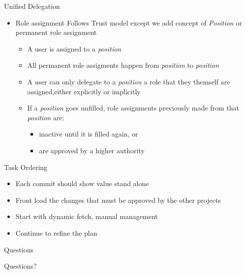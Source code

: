 \documentclass{beamer}
\begin{document}
\begin{frame}{Unified Delegation}
  \begin{itemize}
  \item Role assignment Follows Trust model except we add concept of \textit{Position} or permanent role assignment
    \begin{itemize}
    \item A user is assigned to a \textit{position}
    \item All permanent role assigments happen from \textit{position} to \textit{position}
    \item A user can only delegate to a \textit{position} a role that they themself are assigned,either explicitly or implicitly
    \item If a \textit{position} goes unfilled, role assignments previously made from that \textit{position} are:
      \begin{itemize}
      \item inactive until it is filled again, or
      \item are approved by a higher authority
      \end{itemize}
    \end{itemize}
  \end{itemize}
\end{frame}

    

\begin{frame}{Task Ordering}
  \begin{itemize}
  \item Each commit should show value stand alone
  \item Front load the changes that must be approved by the other projects
  \item Start with dynamic fetch, manual management
  \item Continue to refine the plan
  \end{itemize}
\end{frame}



\begin{frame}{Questions}
  \begin{center}
    \begin{exampleblock}{}
      Questions?
    \end{exampleblock}
  \end{center}
\end{frame}
\end{document}
